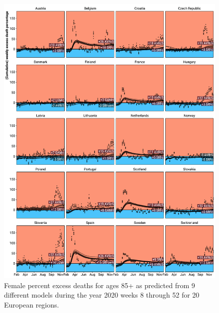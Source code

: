 \documentclass[12pt]{article}
\begin{document}
\begin{appendix}
\begin{figure}
\caption{
Female percent excess deaths for ages 85+ as predicted from 9 different models during the year 2020 weeks 8 through 52 for 20 European regions.}
\label{fig:excessf85plus}
\includegraphics{excess_female__85_inf_.pdf}
\end{figure}



\end{appendix}
\end{document}
